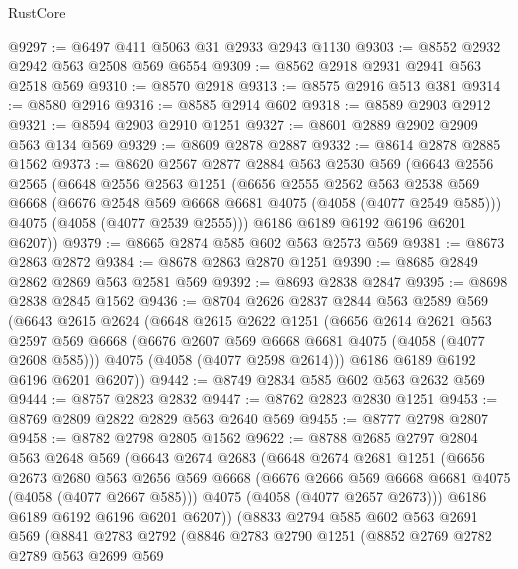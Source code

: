 \begin{lexlean}{RustCore}
\begin{coremodule}
@9297 := @6497 @411 @5063 @31 @2933 @2943 @1130
@9303 := @8552 @2932 @2942 @563 @2508 @569 @6554
@9309 := @8562 @2918 @2931 @2941 @563 @2518 @569
@9310 := @8570 @2918
@9313 := @8575 @2916 @513 @381
@9314 := @8580 @2916
@9316 := @8585 @2914 @602
@9318 := @8589 @2903 @2912
@9321 := @8594 @2903 @2910 @1251
@9327 := @8601 @2889 @2902 @2909 @563 @134 @569
@9329 := @8609 @2878 @2887
@9332 := @8614 @2878 @2885 @1562
@9373 := @8620
    @2567
    @2877
    @2884
    @563
    @2530
    @569
    (@6643
      @2556
      @2565
      (@6648
        @2556
        @2563
        @1251
        (@6656
          @2555
          @2562
          @563
          @2538
          @569
          @6668
          (@6676 @2548 @569 @6668 @6681 @4075 (@4058 (@4077 @2549 @585)))
          @4075
          (@4058 (@4077 @2539 @2555)))
        @6186
        @6189
        @6192
        @6196
        @6201
        @6207))
@9379 := @8665 @2874 @585 @602 @563 @2573 @569
@9381 := @8673 @2863 @2872
@9384 := @8678 @2863 @2870 @1251
@9390 := @8685 @2849 @2862 @2869 @563 @2581 @569
@9392 := @8693 @2838 @2847
@9395 := @8698 @2838 @2845 @1562
@9436 := @8704
    @2626
    @2837
    @2844
    @563
    @2589
    @569
    (@6643
      @2615
      @2624
      (@6648
        @2615
        @2622
        @1251
        (@6656
          @2614
          @2621
          @563
          @2597
          @569
          @6668
          (@6676 @2607 @569 @6668 @6681 @4075 (@4058 (@4077 @2608 @585)))
          @4075
          (@4058 (@4077 @2598 @2614)))
        @6186
        @6189
        @6192
        @6196
        @6201
        @6207))
@9442 := @8749 @2834 @585 @602 @563 @2632 @569
@9444 := @8757 @2823 @2832
@9447 := @8762 @2823 @2830 @1251
@9453 := @8769 @2809 @2822 @2829 @563 @2640 @569
@9455 := @8777 @2798 @2807
@9458 := @8782 @2798 @2805 @1562
@9622 := @8788
    @2685
    @2797
    @2804
    @563
    @2648
    @569
    (@6643
      @2674
      @2683
      (@6648
        @2674
        @2681
        @1251
        (@6656
          @2673
          @2680
          @563
          @2656
          @569
          @6668
          (@6676 @2666 @569 @6668 @6681 @4075 (@4058 (@4077 @2667 @585)))
          @4075
          (@4058 (@4077 @2657 @2673)))
        @6186
        @6189
        @6192
        @6196
        @6201
        @6207))
    (@8833
      @2794
      @585
      @602
      @563
      @2691
      @569
      (@8841
        @2783
        @2792
        (@8846
          @2783
          @2790
          @1251
          (@8852
            @2769
            @2782
            @2789
            @563
            @2699
            @569

\end{coremodule}
\end{lexlean}
